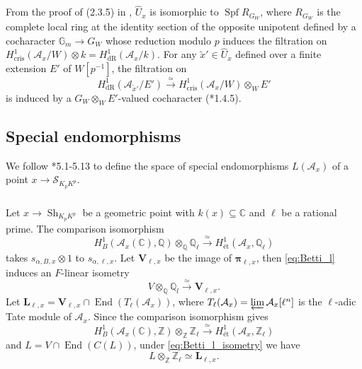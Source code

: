 \documentclass{amsart}
\numberwithin{equation}{subsection}
\numberwithin{theorem}{section}
\theoremstyle{definition}
\theoremstyle{remark}
\newcommand{\bC}{\mathbb{C}}
\newcommand{\bQ}{\mathbb{Q}}
\newcommand{\bZ}{\mathbb{Z}}
\newcommand{\cA}{\mathcal{A}}
\newcommand{\et}{{\text{\'et}}}
\newcommand{\dR}{_{\mathrm{dR}}}
\newcommand{\cris}{_{\mathrm{cris}}}
\DeclareMathOperator{\End}{End}
\DeclareMathOperator{\Spf}{Spf}
\DeclareMathOperator{\Sh}{Sh}
\begin{document}
From the proof of (2.3.5) in \cite{MR2669706}, $\widehat{U}_x$ is isomorphic to $\Spf R_{G_W}$, where $R_{G_W}$ is the complete local ring at the identity section of the opposite unipotent defined by a cocharacter $\mathbb{G}_m \to G_W$ whose reduction modulo $p$ induces the filtration on $H^1\cris(\mathcal{A}_x/W)\otimes k = H^1\dR(\mathcal{A}_x/k)$. For any $\tilde{x}' \in \widehat{U}_x$ defined over a finite extension $E'$ of $W[p^{-1}]$, the filtration on \[H^1\dR(\mathcal{A}_{\tilde{x}'}/E')\xrightarrow{\simeq}H^{1}\cris(\mathcal{A}_x/W)\otimes_W E'\] is induced by a $G_W\otimes_W E'$-valued cocharacter (\cite{MR2669706}*{1.4.5}). 
 
\subsection{Special endomorphisms}
We follow \cite{MR3484114}*{5.1-5.13} to define the space of special endomorphisms $L(\cA_x)$ of a point $x\to \mathscr{S}_{K_pK^p}$. 

\subsubsection{}
Let $x\to \Sh_{K_pK^p}$ be a geometric point with $k(x)\subseteq \bC$ and $\ell$ be a rational prime. 
The comparison isomorphism \begin{equation}\label{eq:Betti_l}
    H^1_B(\mathcal{A}_{x}(\bC), \bQ)\otimes_{\bQ} \bQ_\ell\xrightarrow{\simeq}H^1_{\et}(\mathcal{A}_{x}, \bQ_\ell)
\end{equation} takes $s_{\alpha, B,x}\otimes 1$ to $s_{\alpha, \ell, x}$. Let $\bm{V}_{\ell, x}$ be the image of $\bm{\pi}_{\ell,x}$, then \eqref{eq:Betti_l} induces an $F$-linear isometry \begin{equation}\label{eq:Betti_l_isometry}
    V\otimes_{\bQ}\bQ_l \xrightarrow{\simeq} \bm{V}_{\ell,x}.
\end{equation}  Let $\bm{L}_{\ell,x} = \bm{V}_{\ell,x} \cap \End(T_\ell(\cA_x))$, where $T_\ell(\cA_x) = \varprojlim \cA_x[\ell^n]$ is the $\ell$-adic Tate module of $\cA_x$. Since the comparison isomorphism gives \begin{equation}H^1_B(\mathcal{A}_{x}(\bC), \bZ)\otimes_{\bZ} \bZ_\ell\xrightarrow{\simeq}H^1_{\et}(\mathcal{A}_{x}, \bZ_\ell)\end{equation} and $L = V\cap \End(C(L))$,  under \eqref{eq:Betti_l_isometry} we have  \begin{equation}L\otimes_{\bZ}\bZ_\ell \simeq \bm{L}_{\ell,x}.\end{equation}  
\end{document}
